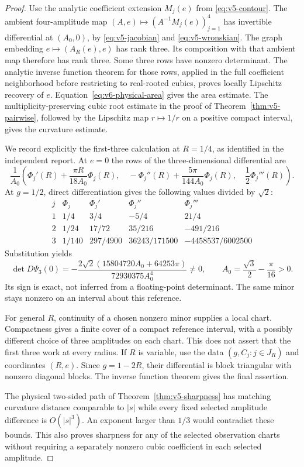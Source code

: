 \begin{proof}
Use the analytic coefficient extension $M_j(e)$ from
\eqref{eq:v5-contour}. The ambient four-amplitude map
$(A,e)\mapsto(A^{-1}M_j(e))_{j=1}^4$ has invertible differential at
$(A_0,0)$, by \eqref{eq:v5-jacobian} and
\eqref{eq:v5-wronskian}. The graph embedding
$e\mapsto(A_R(e),e)$ has rank three. Its composition with that
ambient map therefore has rank three. Some three rows have nonzero
determinant. The analytic inverse function theorem for those rows,
applied in the full coefficient neighborhood before restricting to
real-rooted cubics, proves locally Lipschitz recovery of $e$.
Equation~\eqref{eq:v6-physical-area} gives the area estimate. The
multiplicity-preserving cubic root estimate in the proof of
Theorem~\ref{thm:v5-pairwise}, followed by the Lipschitz map $r\mapsto1/r$
on a positive compact interval, gives the curvature estimate.

We record explicitly the first-three calculation at $R=1/4$, as
identified in the independent report. At $e=0$ the rows of the
three-dimensional differential are
\[
 \frac1{A_0}\left(
 \Phi_j'(R)+\frac{\pi R}{18A_0}\Phi_j(R),\quad
 -\Phi_j''(R)+\frac{5\pi}{144A_0}\Phi_j(R),\quad
 \frac12\Phi_j'''(R)\right).
\]
At $g=1/2$, direct differentiation gives the following values divided
by $\sqrt2$:
\[
\begin{array}{c|rrrr}
 j&\Phi_j&\Phi_j'&\Phi_j''&\Phi_j'''\\\hline
 1&1/4&3/4&-5/4&21/4\\
 2&1/24&17/72&35/216&-491/216\\
 3&1/140&297/4900&36243/171500&-4458537/6002500
\end{array}
\]
Substitution yields
\begin{equation}\label{eq:v6-three-jacobian}
 \det D\Psi_3(0)
 =-\frac{2\sqrt2(15804720A_0+64253\pi)}{72930375A_0^4}\ne0,
 \qquad A_0=\frac{\sqrt3}{2}-\frac\pi{16}>0.
\end{equation}
Its sign is exact, not inferred from a floating-point determinant.
The same minor stays nonzero on an interval about this reference.

For general $R$, continuity of a chosen nonzero minor supplies a local
chart. Compactness gives a finite cover of a compact reference interval,
with a possibly different choice of three amplitudes on each chart.
This does not assert that the first three work at every radius. If $R$
is variable, use the data $(g,C_j:j\in J_R)$ and coordinates $(R,e)$.
Since $g=1-2R$, their differential is block triangular with nonzero
diagonal blocks. The inverse function theorem gives the final assertion.

The physical two-sided path of Theorem~\ref{thm:v5-sharpness} has
matching curvature distance comparable to $|s|$ while every fixed
selected amplitude difference is $O(|s|^3)$. An exponent larger than
$1/3$ would contradict these bounds. This also proves sharpness for
any of the selected observation charts without requiring a separately
nonzero cubic coefficient in each selected amplitude.
\end{proof}


